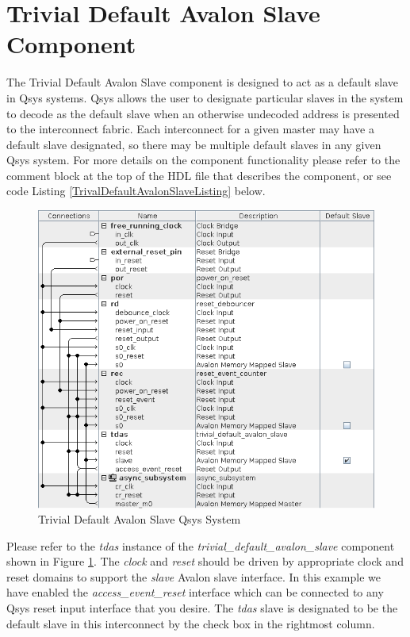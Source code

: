 \documentclass{article}
\begin{document}
\section*{Trivial Default Avalon Slave Component}
\begin{flushleft}
\noindent
The Trivial Default Avalon Slave component is designed to act as a default slave in Qsys systems.  Qsys allows the user to designate particular slaves in the system to decode as the default slave when an otherwise undecoded address is presented to the interconnect fabric.  Each interconnect for a given master may have a default slave designated, so there may be multiple default slaves in any given Qsys system.  For more details on the component functionality please refer to the comment block at the top of the HDL file that describes the component, or see code Listing \ref{TrivalDefaultAvalonSlaveListing} below.

\begin{figure}[H]
\centering
\includegraphics[scale=0.675]{tdas_qsys}
\caption{Trivial Default Avalon Slave Qsys System}
\label{fig:tdas_qsys}
\end{figure}

Please refer to the \emph{tdas} instance of the \emph{trivial\_default\_avalon\_slave} component shown in Figure \ref{fig:tdas_qsys}.  The \emph{clock} and \emph{reset} should be driven by appropriate clock and reset domains to support the \emph{slave} Avalon slave interface.  In this example we have enabled the \emph{access\_event\_reset} interface which can be connected to any Qsys reset input interface that you desire.  The \emph{tdas} slave is designated to be the default slave in this interconnect by the check box in the rightmost  column.


\end{flushleft}
\end{document}
